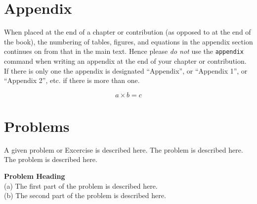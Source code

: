 \section*{Appendix}
%
When placed at the end of a chapter or contribution (as opposed to at the end of the book), the numbering of tables, figures, and equations in the appendix section continues on from that in the main text. Hence please \textit{do not} use the \verb|appendix| command when writing an appendix at the end of your chapter or contribution. If there is only one the appendix is designated ``Appendix'', or ``Appendix 1'', or ``Appendix 2'', etc. if there is more than one.

\begin{equation}
a \times b = c
\end{equation}
\section*{Problems}
%
\setcounter{prob}{19}
\setcounter{chapter}{3}
\begin{prob}
\label{prob1}
A given problem or Excercise is described here. The
problem is described here. The problem is described here.
\end{prob}

\begin{prob}
\label{prob2}
\textbf{Problem Heading}\\
(a) The first part of the problem is described here.\\
(b) The second part of the problem is described here.
\end{prob}


